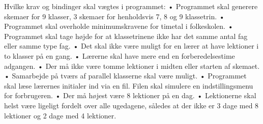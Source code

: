 Hvilke krav og bindinger skal vægtes i programmet:
•	Programmet skal generere skemaer for 9 klasser, 3 skemaer for henholdsvis 7, 8 og 9 klassetrin.
•	Programmet skal overholde minimumskravene for timetal i folkeskolen.
•	Programmet skal tage højde for at klassetrinene ikke har det samme antal fag eller samme type fag.
•	Det skal ikke være muligt for en lærer at have lektioner i to klasser på en gang.
•	Lærerne skal have mere end en forberedelsestime adgangen.
•	Der må ikke være tomme lektioner i midten eller starten af skemaet.
•	Samarbejde på tværs af parallel klasserne skal være muligt. 
•	Programmet skal læse lærernes initialer ind via en fil. Filen skal simulere en indstillingsmenu for forbrugeren.
•	Der må højest være 8 lektioner på en dag.
•	Lektionerne skal helst være ligeligt fordelt over alle ugedagene, således at der ikke er 3 dage med 8 lektioner og 2 dage med 4 lektioner.
